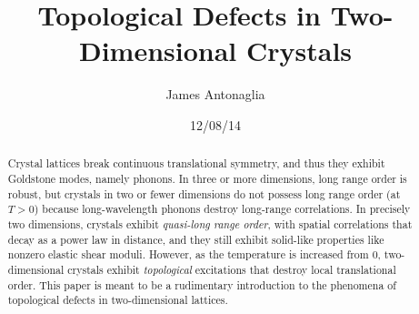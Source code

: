 \documentclass[a4paper,10pt]{article}
\title{Topological Defects in Two-Dimensional Crystals}
\author{James Antonaglia}
\date{12/08/14}
\begin{document}
 
\maketitle

\begin{abstract}
 Crystal lattices break continuous translational symmetry, and thus they 
exhibit Goldstone modes, namely phonons. In three or more dimensions, long 
range order is robust, but crystals in two or fewer dimensions do not possess 
long range order (at $T>0$) because long-wavelength phonons destroy 
long-range correlations. In precisely two dimensions, crystals exhibit 
\emph{quasi-long range order}, with spatial correlations that decay as a power 
law in distance, and they still exhibit solid-like properties like 
nonzero elastic 
shear moduli. However, as the temperature is increased from 0, two-dimensional 
crystals exhibit \emph{topological} excitations that destroy local 
translational order. This paper is meant to be a rudimentary 
introduction to the phenomena of topological defects in two-dimensional 
lattices.
\end{abstract}

\pagebreak
\end{document}
